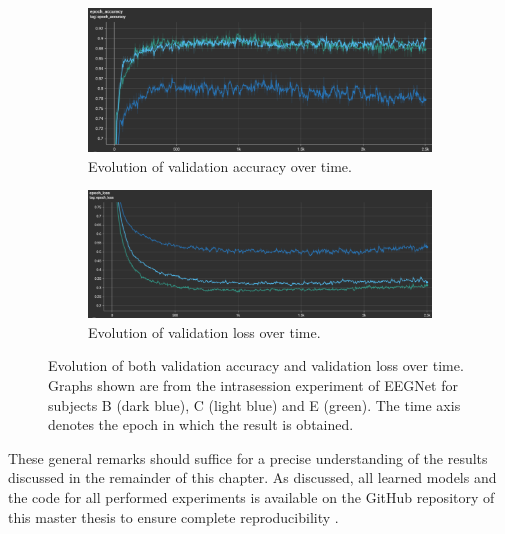 \begin{figure}[ht]
    \centering
    \begin{subfigure}{0.9\textwidth}
        \centering
        \includegraphics[width=\textwidth]{../images/results/accuracy.pdf}
        \captionsetup{width=\linewidth}
        \captionsetup{justification=centering}
        \caption{Evolution of validation accuracy over time.}
        \label{fig:results_tensorboard_acc}
    \end{subfigure}
    \hfill
    \vfill
    \begin{subfigure}{0.9\textwidth}
        \centering
        \includegraphics[width=\textwidth]{../images/results/loss.pdf}
        \captionsetup{width=\linewidth}
        \captionsetup{justification=centering}
        \caption{Evolution of validation loss over time.}
        \label{fig:results_tensorboard_loss}
    \end{subfigure}
    \captionsetup{width=\linewidth}
    \captionsetup{justification=centering}
    \caption{Evolution of both validation accuracy and validation loss over time. Graphs shown are from the intrasession experiment of EEGNet for subjects B (dark blue), C (light blue) and E (green). The time axis denotes the epoch in which the result is obtained.}
    \label{fig:results_tensorboard}
\end{figure}

These general remarks should suffice for a precise understanding of the results discussed in the remainder of this chapter.
As discussed, all learned models and the code for all performed experiments is available on the GitHub repository of this master thesis to ensure complete reproducibility \citep{github_project}.

